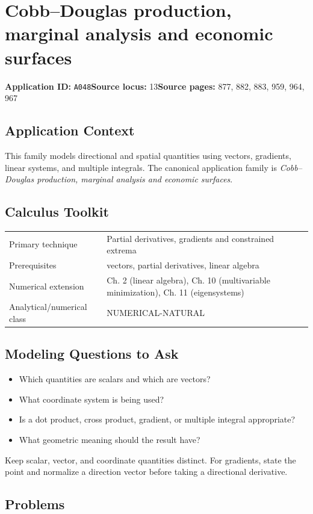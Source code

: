 \documentclass[11pt]{book}
\newcommand{\pid}[1]{\texttt{#1}}
\begin{document}
\chapter{Cobb–Douglas production, marginal analysis and economic surfaces}\label{app:A048}
\textbf{Application ID:} \pid{A048}\quad \textbf{Source locus:} 13\quad \textbf{Source pages:} 877, 882, 883, 959, 964, 967
\section*{Application Context}
This family models directional and spatial quantities using vectors, gradients, linear systems, and multiple integrals. The canonical application family is \emph{Cobb–Douglas production, marginal analysis and economic surfaces}.
\section*{Calculus Toolkit}
\begin{tabularx}{\textwidth}{@{}lX@{}}\toprule
Primary technique & Partial derivatives, gradients and constrained extrema \\
Prerequisites & vectors, partial derivatives, linear algebra \\
Numerical extension & Ch. 2 (linear algebra), Ch. 10 (multivariable minimization), Ch. 11 (eigensystems) \\
Analytical/numerical class & NUMERICAL-NATURAL \\
\bottomrule\end{tabularx}
\section*{Modeling Questions to Ask}\begin{itemize}
\item Which quantities are scalars and which are vectors?
\item What coordinate system is being used?
\item Is a dot product, cross product, gradient, or multiple integral appropriate?
\item What geometric meaning should the result have?
\end{itemize}
\begin{errorbox}Keep scalar, vector, and coordinate quantities distinct. For gradients, state the point and normalize a direction vector before taking a directional derivative.\end{errorbox}
\section*{Problems}
\end{document}

